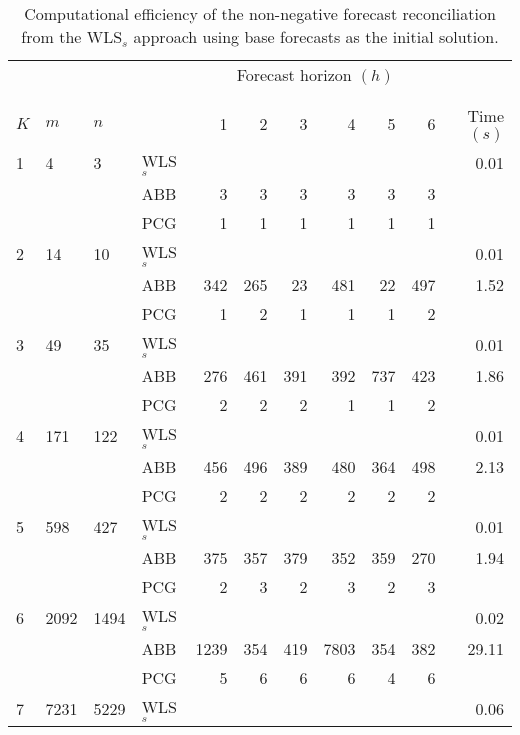 \documentclass[11pt]{article}
\newcommand{\0}{\phantom{0}}
\begin{document}
\begin{table}[ht]
	\small
	\tabcolsep=0.20cm
	\caption{Computational efficiency of the non-negative forecast reconciliation from the WLS$_{s}$ approach using base forecasts as the initial solution.}
	\label{tbl:perfnnwlsb}
	\centering
	\begin{threeparttable}
		\begin{tabular}{llllrrrrrrr}
			\toprule
			& & & & \multicolumn{6}{c}{Forecast horizon $(h)$}\\[-0.3cm]\\\cline{5-10}\\[-0.3cm]
			$K$ & $m$ & $n$ & & 1 & 2 & 3 & 4 & 5 & 6 & Time $(s)$\\
			\midrule
			1 & 4 & 3 & WLS$_{s}$ & & & & & & & 0.01 \\
			& & & ABB & 3 & 3 & 3 & 3 & 3 & 3 & \bm{$0.04$} \\
			& & & PCG & 1 & 1 & 1 & 1 & 1 & 1 & \bm{$0.04$} \\
			\midrule
			2 & 14 & 10 & WLS$_{s}$ & & & & & & & 0.01\\
			& & & ABB & 342 & 265 & 23 & 481 & 22 & 497 & 1.52 \\
			& & & PCG & 1 & 2 & 1 & 1 & 1 & 2 & \bm{$0.10$} \\
			\midrule
			3 & 49 & 35 & WLS$_{s}$ & & & & & & & 0.01 \\
			& & & ABB & 276 & 461 & 391 & 392 & 737 & 423 & 1.86 \\
			& & & PCG & 2 & 2 & 2 & 1 & 1 & 2 & \bm{$0.17$} \\
			\midrule
			4 & 171 & 122 & WLS$_{s}$ & & & & & & & 0.01 \\
			& & & ABB & 456 & 496 & 389 & 480 & 364 & 498 & 2.13 \\
			& & & PCG & 2 & 2 & 2 & 2 & 2 & 2 & \bm{$0.29$} \\
			\midrule
			5 & 598 & 427 & WLS$_{s}$ & & & & & & & 0.01 \\
			& & & ABB & 375 & 357 & 379 & 352 & 359 & 270 & 1.94 \\
			& & & PCG & 2 & 3 & 2 & 3 & 2 & 3 & \bm{$0.33$} \\
			\midrule
			6 & 2092 & 1494 & WLS$_{s}$ & & & & & & & 0.02 \\
			& & & ABB & 1239 & 354 & 419 & 7803 & 354 & 382 & 29.11\\
			& & & PCG & 5 & 6 & 6 & 6 & 4 & 6 & \bm{$0.51$} \\
			\midrule
			7 & 7231 & 5229 & WLS$_{s}$ & & & & & & & 0.06 \\

\end{tabular}
\end{threeparttable}
\end{table}
\end{document}

